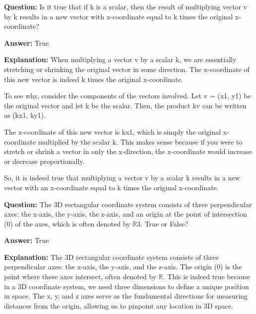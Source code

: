 \documentclass{article}
\begin{document}
                \vspace{0.5cm} 
        
            
                \textbf {Question:} Is it true that if k is a scalar, then the result of multiplying vector v by k results in a new vector with x-coordinate equal to k times the original x-coordinate?
                
                \textbf{Answer:} True

                \textbf{Explanation:} When multiplying a vector v by a scalar k, we are essentially stretching or shrinking the original vector in some direction. The x-coordinate of this new vector is indeed k times the original x-coordinate.

To see why, consider the components of the vectors involved. Let v = (x1, y1) be the original vector and let k be the scalar. Then, the product kv can be written as (kx1, ky1).

The x-coordinate of this new vector is kx1, which is simply the original x-coordinate multiplied by the scalar k. This makes sense because if you were to stretch or shrink a vector in only the x-direction, the x-coordinate would increase or decrease proportionally.

So, it is indeed true that multiplying a vector v by a scalar k results in a new vector with an x-coordinate equal to k times the original x-coordinate.
                
                \vspace{0.5cm} 
        
            
                \textbf {Question:} The 3D rectangular coordinate system consists of three perpendicular axes: the x-axis, the y-axis, the z-axis, and an origin at the point of intersection (0) of the axes, which is often denoted by \ensuremath{\mathbb{R}}3. True or False?
                
                \textbf{Answer:} True

                \textbf{Explanation:} The 3D rectangular coordinate system consists of three perpendicular axes: the x-axis, the y-axis, and the z-axis. The origin (0) is the point where these axes intersect, often denoted by \ensuremath{\mathbb{R}}{\textthreesuperior}. This is indeed true because in a 3D coordinate system, we need three dimensions to define a unique position in space. The x, y, and z axes serve as the fundamental directions for measuring distances from the origin, allowing us to pinpoint any location in 3D space.
                
\end{document}
